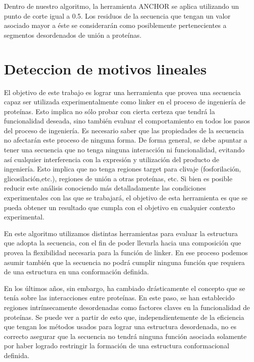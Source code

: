 Dentro de nuestro algoritmo, la herramienta ANCHOR se aplica utilizando un punto de corte igual a 0.5. Los residuos de la secuencia que tengan un valor asociado mayor a 
éste se considerarán como posiblemente pertenecientes a segmentos desordenados de unión a proteínas.   



\section{Deteccion de motivos lineales}
El objetivo de este trabajo es lograr una herramienta que provea una secuencia capaz ser utilizada experimentalmente como linker en el proceso de ingeniería de proteínas. 
Esto implica no sólo probar con cierta certeza que tendrá la funcionalidad deseada, sino también evaluar el comportamiento en todos los pasos del proceso de ingeniería. 
Es necesario saber que las propiedades de la secuencia no afectarán este proceso de ninguna forma.
De forma general, se debe apuntar a tener una secuencia que no tenga ninguna interacción ni funcionalidad, evitando así cualquier interferencia con la expresión y utilización del producto 
de ingeniería. Esto implica que no tenga regiones target para clivaje (fosforilación, glicosilación,etc.), regiones de unión a otras proteínas, etc.
Si bien es posible reducir este análisis conociendo más detalladamente las condiciones experimentales con las que se trabajará, el objetivo de esta herramienta es que se pueda obtener 
un resultado que cumpla con el objetivo en cualquier contexto experimental. 

En este algoritmo utilizamos distintas herramientas para evaluar la estructura que adopta la secuencia, con el fin de poder llevarla hacia una composición que provea la flexibilidad
necesaria para la función de linker. En ese proceso podemos asumir también que la secuencia no podrá cumplir ninguna función que requiera de una estructura en una conformación definida.

En los últimos años, sin embargo, ha cambiado drásticamente el concepto que se tenía sobre las interacciones entre proteínas. En este paso, se han establecido regiones intrínsecamente
desordenadas como factores claves en la funcionalidad de proteínas. Se puede ver a partir de esto que, independientemente de la eficiencia que tengan los métodos usados para lograr una 
estructura desordenada, no es correcto asegurar que la secuencia no tendrá ninguna función asociada solamente por haber logrado restringir la formación de una estructura conformacional definida.

